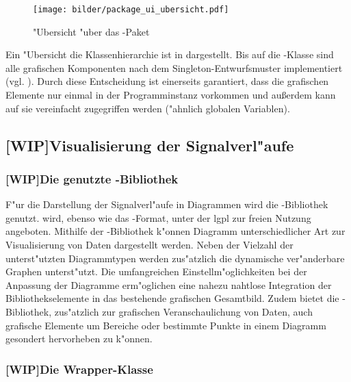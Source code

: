 \begin{figure}[htb]
\centering
\texttt{[image: bilder/package\_ui\_ubersicht.pdf]}
\caption{"Ubersicht "uber das -Paket}
\label{pic:package_ui_ubersicht}
\end{figure}

Ein "Ubersicht die Klassenhierarchie ist in  dargestellt.
Bis auf die -Klasse sind alle grafischen Komponenten nach dem Singleton-Entwurfsmuster implementiert (vgl. ).
Durch diese Entscheidung ist einerseits garantiert, dass die grafischen Elemente nur einmal in der Programminstanz vorkommen und au{\ss}erdem kann auf sie vereinfacht zugegriffen werden ("ahnlich globalen Variablen).


\subsection{[WIP]Visualisierung der Signalverl"aufe}

\subsubsection{[WIP]Die genutzte \jfcNS-Bibliothek}

F"ur die Darstellung der Signalverl"aufe in Diagrammen wird die \javaNS-Bibliothek \jfc genutzt.
\jfc wird, ebenso wie das \usNS-Format, unter der \ac{lgpl} zur freien Nutzung angeboten.
Mithilfe der \jfcNS-Bibliothek k"onnen Diagramm unterschiedlicher Art zur Visualisierung von Daten dargestellt werden.
Neben der Vielzahl der unterst"utzten Diagrammtypen werden zus"atzlich die dynamische ver"anderbare Graphen unterst"utzt.
Die umfangreichen Einstellm"oglichkeiten bei der Anpassung der Diagramme erm"oglichen eine nahezu nahtlose Integration der Bibliothekselemente in das bestehende grafischen Gesamtbild.
Zudem bietet die \jfcNS-Bibliothek, zus"atzlich zur grafischen Veranschaulichung von Daten, auch grafische Elemente um Bereiche oder bestimmte Punkte in einem Diagramm gesondert hervorheben zu k"onnen.


\subsubsection{[WIP]Die Wrapper-Klasse }

